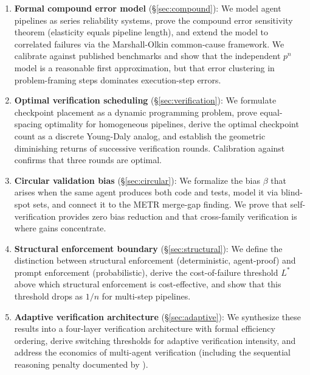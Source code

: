 \documentclass[11pt, a4paper, copyright]{googledeepmind}
\begin{document}
\begin{enumerate}
\item \textbf{Formal compound error model} (\S\ref{sec:compound}): We model agent pipelines as series reliability systems, prove the compound error sensitivity theorem (elasticity equals pipeline length), and extend the model to correlated failures via the Marshall-Olkin common-cause framework. We calibrate against published benchmarks and show that the independent $p^n$ model is a reasonable first approximation, but that error clustering in problem-framing steps dominates execution-step errors.

\item \textbf{Optimal verification scheduling} (\S\ref{sec:verification}): We formulate checkpoint placement as a dynamic programming problem, prove equal-spacing optimality for homogeneous pipelines, derive the optimal checkpoint count as a discrete Young-Daly analog, and establish the geometric diminishing returns of successive verification rounds. Calibration against \citet{hariharan2025plan} confirms that three rounds are optimal.

\item \textbf{Circular validation bias} (\S\ref{sec:circular}): We formalize the bias $\beta$ that arises when the same agent produces both code and tests, model it via blind-spot sets, and connect it to the METR merge-gap finding. We prove that self-verification provides zero bias reduction and that cross-family verification is where gains concentrate.

\item \textbf{Structural enforcement boundary} (\S\ref{sec:structural}): We define the distinction between structural enforcement (deterministic, agent-proof) and prompt enforcement (probabilistic), derive the cost-of-failure threshold $L^*$ above which structural enforcement is cost-effective, and show that this threshold drops as $1/n$ for multi-step pipelines.

\item \textbf{Adaptive verification architecture} (\S\ref{sec:adaptive}): We synthesize these results into a four-layer verification architecture with formal efficiency ordering, derive switching thresholds for adaptive verification intensity, and address the economics of multi-agent verification (including the sequential reasoning penalty documented by \citeauthor{google2025scaling}).
\end{enumerate}

\end{document}
